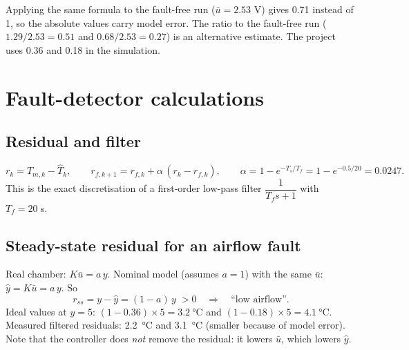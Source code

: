 \documentclass[11pt,a4paper]{article}
\begin{document}
\begin{note}
Applying the same formula to the fault-free run ($\bar u = 2.53$ V) gives 0.71 instead of 1, so the
absolute values carry model error. The ratio to the fault-free run ($1.29/2.53 = 0.51$ and
$0.68/2.53 = 0.27$) is an alternative estimate. The project uses 0.36 and 0.18 in the simulation.
\end{note}

\section{Fault-detector calculations}

\subsection{Residual and filter}
\[
r_k = T_{m,k} - \hat T_k,\qquad
r_{f,k+1} = r_{f,k} + \alpha\,(r_k - r_{f,k}),\qquad
\alpha = 1 - e^{-T_s/T_f} = 1 - e^{-0.5/20} = \boxed{0.0247}.
\]
This is the exact discretisation of a first-order low-pass filter $\dfrac{1}{T_f s + 1}$ with $T_f = 20$ s.

\subsection{Steady-state residual for an airflow fault}
Real chamber: $K\bar u = a\,y$. Nominal model (assumes $a = 1$) with the same $\bar u$: $\hat y = K\bar u = a\,y$. So
\[
\boxed{\;r_{ss} = y - \hat y = (1 - a)\,y\;} > 0 \quad\Rightarrow\quad \text{``low airflow''}.
\]
Ideal values at $y = 5$: $(1 - 0.36)\times5 = \SI{3.2}{\celsius}$ and $(1 - 0.18)\times5 = \SI{4.1}{\celsius}$.
Measured filtered residuals: \SI{2.2}{\celsius} and \SI{3.1}{\celsius} (smaller because of model error).
Note that the controller does \emph{not} remove the residual: it lowers $\bar u$, which lowers $\hat y$.
\end{document}
